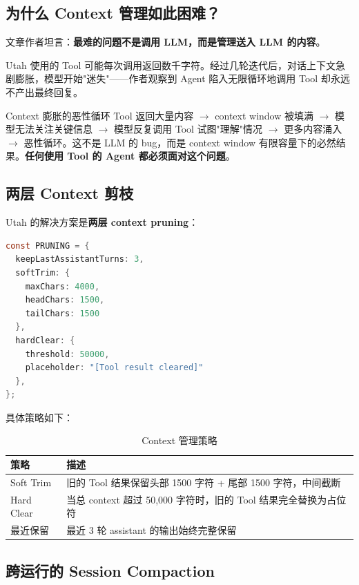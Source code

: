\documentclass[a4paper]{article}
\begin{document}
\subsection{为什么 Context 管理如此困难？}

文章作者坦言：\textbf{最难的问题不是调用 LLM，而是管理送入 LLM 的内容}。

Utah 使用的 Tool 可能每次调用返回数千字符。经过几轮迭代后，对话上下文急剧膨胀，模型开始"迷失"——作者观察到 Agent 陷入无限循环地调用 Tool 却永远不产出最终回复。

\begin{warningbox}{Context 膨胀的恶性循环}
Tool 返回大量内容 $\to$ context window 被填满 $\to$ 模型无法关注关键信息 $\to$ 模型反复调用 Tool 试图"理解"情况 $\to$ 更多内容涌入 $\to$ 恶性循环。这不是 LLM 的 bug，而是 context window 有限容量下的必然结果。\textbf{任何使用 Tool 的 Agent 都必须面对这个问题}。
\end{warningbox}

\subsection{两层 Context 剪枝}

Utah 的解决方案是\textbf{两层 context pruning}：

\begin{lstlisting}[caption={Context 剪枝配置},language=Java]
const PRUNING = {
  keepLastAssistantTurns: 3,
  softTrim: {
    maxChars: 4000,
    headChars: 1500,
    tailChars: 1500
  },
  hardClear: {
    threshold: 50000,
    placeholder: "[Tool result cleared]"
  },
};
\end{lstlisting}

具体策略如下：

\begin{table}[H]
\centering
\caption{Context 管理策略}
\begin{tabular}{lp{9cm}}
\toprule
\textbf{策略} & \textbf{描述} \\
\midrule
Soft Trim & 旧的 Tool 结果保留头部 1500 字符 + 尾部 1500 字符，中间截断 \\
Hard Clear & 当总 context 超过 50,000 字符时，旧的 Tool 结果完全替换为占位符 \\
最近保留 & 最近 3 轮 assistant 的输出始终完整保留 \\
\bottomrule
\end{tabular}
\end{table}

\subsection{跨运行的 Session Compaction}
\end{document}
